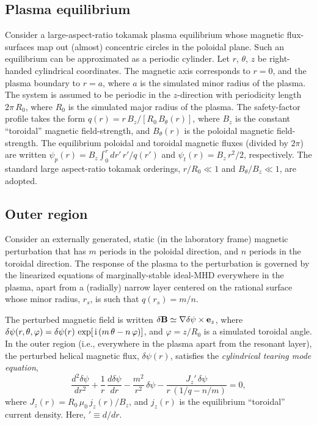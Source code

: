 \documentclass[12pt,prb,aps]{revtex4-1}
\begin{document}
\subsection{Plasma equilibrium}\label{cyleq}
Consider a large-aspect-ratio tokamak plasma equilibrium whose magnetic flux-surfaces map out
(almost) concentric circles in the poloidal plane. Such an equilibrium can be approximated as a
periodic cylinder.\cite{rf1993} Let $r$, $\theta$, $z$ be right-handed cylindrical coordinates. 
The magnetic axis corresponds to $r=0$, and the plasma boundary to $r=a$, where $a$ is the simulated minor radius of the plasma. The system is assumed to be periodic in the $z$-direction with periodicity length $2\pi\,R_0$, where $R_0$ is the simulated major radius of the plasma. The
safety-factor profile takes the form $q(r)=r\,B_z/[R_0\,B_\theta(r)]$, where $B_z$ is the constant
``toroidal'' magnetic field-strength, and $B_\theta(r)$ is the poloidal magnetic field-strength. The equilibrium poloidal and toroidal magnetic
fluxes (divided by $2\pi$) are written $\psi_p(r)=B_z\int_0^r dr'\,r'/q(r')$ and $\psi_t(r)=B_z\,r^2/2$, respectively.
The standard
large aspect-ratio tokamak orderings, $r/R_0\ll 1$ and $B_\theta/B_z\ll 1$, are adopted.\cite{ric3}

\subsection{Outer region}\label{cyl}
Consider an externally generated,  static (in the laboratory frame) magnetic perturbation that has $m$ periods in the poloidal direction, and
$n$ periods in the toroidal direction. 
The response of the plasma to the perturbation is
governed by the linearized equations of marginally-stable ideal-MHD everywhere in the plasma, apart from a (radially) narrow
layer centered on the rational surface whose minor radius, $r_s$,  is such that $q(r_s)=m/n$.\cite{fkr}

The perturbed magnetic field is written $\delta{\bf B} \simeq \nabla\delta\psi\times{\bf e}_z$,  
where
$\delta\psi(r,\theta,\varphi)= \delta\psi(r)\,\exp[\,{\rm i}\,(m\,\theta-n\,\varphi)]$, 
and $\varphi=z/R_0$ is a simulated toroidal angle. 
In the outer region  (i.e., everywhere in the plasma
apart from the resonant layer), the perturbed helical magnetic flux, $\delta\psi(r)$, satisfies the
{\em cylindrical tearing mode equation},\cite{ric3,cyl,wes}
\begin{equation}\label{e3}
\frac{d^2 \delta\psi}{d r^2} + \frac{1}{r}\,\frac{d \delta\psi}{dr}-\frac{m^2}{r^2}\,\delta\psi - \frac{J_z'\,\delta\psi}{r\,(1/q-n/m)}=  0,
\end{equation}
where 
$J_z(r)= R_0\,\mu_0\,j_z(r)/B_z$,
and $j_z(r)$ is the equilibrium ``toroidal'' current density. Here, $'\equiv d/dr$. 
\end{document}
